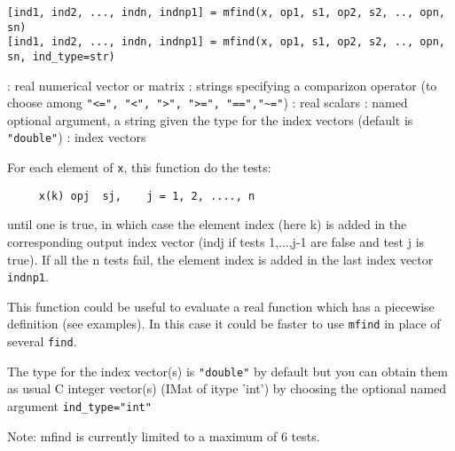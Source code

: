 
\begin{mandesc}
\end{mandesc}

\begin{calling_sequence}
\begin{verbatim}
[ind1, ind2, ..., indn, indnp1] = mfind(x, op1, s1, op2, s2, .., opn, sn)
[ind1, ind2, ..., indn, indnp1] = mfind(x, op1, s1, op2, s2, .., opn, sn, ind_type=str)
\end{verbatim}
\end{calling_sequence}
\begin{parameters}
  \begin{varlist}
    :  real numerical vector or matrix
    : strings specifying a comparizon operator (to choose among \verb+"<=", "<", ">", ">=", "==","~="+)
    :  real scalars
    :  named optional argument, a string given the type for the index vectors (default is \verb+"double"+)
    : index vectors
  \end{varlist}
\end{parameters}

\begin{mandescription}
For each element of \verb+x+, this function do the tests:
\begin{verbatim}
     x(k) opj  sj,    j = 1, 2, ...., n
\end{verbatim}
until one is true, in which case the element index (here k) is added in the
corresponding output index vector (indj if tests 1,...,j-1 are false and test j is true).
If all the n tests fail, the element index is added in the last index vector \verb+indnp1+.

This function could be useful to evaluate a real function which has a piecewise definition
(see examples). In this case it could be faster to use \verb+mfind+ in place of several \verb+find+.


The type for the index vector(s) is \verb+"double"+ by default but you
can obtain them as usual C integer vector(s) (IMat of itype 'int') 
by choosing the optional named argument \verb+ind_type="int"+

Note: mfind is currently limited to a maximum of 6 tests.
\end{mandescription}

